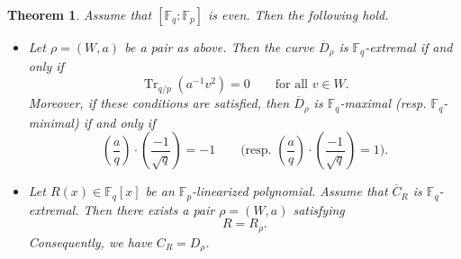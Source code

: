 \documentclass[12pt,a4paper]{amsart}
\newtheorem{theorem}{Theorem}[section]
\theoremstyle{definition}
\def\F{{\mathbb F}}
\theoremstyle{remark}
\DeclareMathOperator{\Tr}{Tr}
\begin{document}
\begin{theorem}\label{t1}
Assume that $[\F_q:\F_p]$ is even. Then the following hold.  
\begin{itemize}
\item[{\rm (i)}]  Let $\rho=(W,a)$ be a pair as above. 
Then the curve $\overline{D}_\rho$ is $\F_q$-extremal if and only if 
\[\Tr_{q/p}(a^{-1}v^2)=0 \qquad\text{for all }v\in W.\]
Moreover, if these conditions are satisfied, then $\overline{D}_\rho$ is $\F_q$-maximal (resp. $\F_q$-minimal) if and only if 
    \[
    \left(\frac{a}{q}\right)\cdot \left(\frac{-1}{\sqrt{q}}\right)=-1 \qquad\text{(resp. }\left(\frac{a}{q}\right)\cdot \left(\frac{-1}{\sqrt{q}}\right)=1). 
    \]
\item[{\rm (ii)}] 

Let $R(x)\in\F_q[x]$ be an $\F_p$-linearized polynomial. Assume that  $\overline{C}_R$ is 
$\F_q$-extremal. Then there exists a pair $\rho=(W,a)$ satisfying 
\[R=R_\rho. \]
Consequently, we have $C_{R}=D_\rho$. 
\end{itemize}
\end{theorem}
\end{document}
